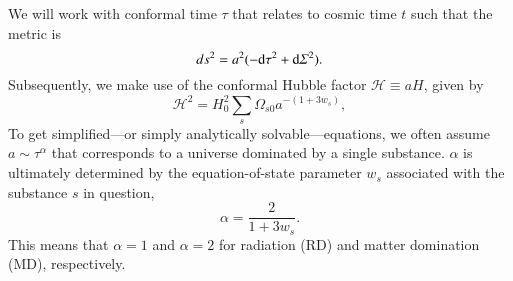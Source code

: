 









We will work with conformal time $\tau$ that relates to cosmic time $t$ such that the metric is%
\begin{equation}
    {ds}^2 = a^2 (-{\diff \tau}^2+ {\diff \varSigma}^2).
\end{equation}
Subsequently, we make use of the conformal Hubble factor $\mathcal{H}\equiv a H$, given by
\begin{equation}\label{eq:GR:lcdm:first_Friedmann_conformal}
    \mathcal{H}^2 = H_0^2 \sum_s \Omega_{s0} a^{-(1+3w_s)},
\end{equation}
To get simplified---or simply analytically solvable---equations, we often assume $a\sim \tau^\alpha$ that corresponds to a universe dominated by a single substance. $\alpha$ is ultimately determined by the equation-of-state parameter $w_s$ associated with the substance $s$ in question, 
\begin{equation}
    \alpha = \frac{2}{1+3w_s}.
\end{equation}
This means that $\alpha=1$ and $\alpha=2$ for radiation (RD) and matter domination (MD), respectively. %

